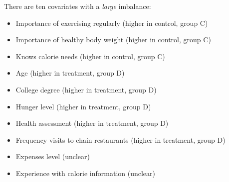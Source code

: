 \begin{enumerate}
  There are ten covariates with a \emph{large} imbalance:
  \begin{itemize}
    \item Importance of exercising regularly (higher in control, group C)
    \item Importance of healthy body weight (higher in control, group C)
    \item Knows calorie needs (higher in control, group C)
    \item Age (higher in treatment, group D)
    \item College degree (higher in treatment, group D)
    \item Hunger level (higher in treatment, group D)
    \item Health assessment (higher in treatment, group D)
    \item Frequency visits to chain restaurants (higher in treatment, group D)
    \item Expenses level (unclear)
    \item Experience with calorie information (unclear)
  \end{itemize}

\end{enumerate}
